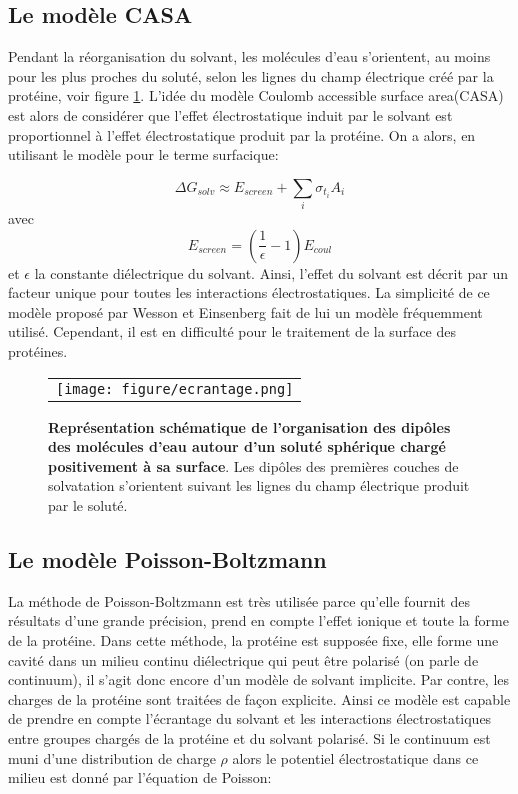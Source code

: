 \subsection{Le modèle CASA}
\label{sub:CASA}
Pendant la réorganisation du solvant, les molécules d'eau s'orientent, au moins pour les plus proches du soluté, selon les lignes du champ électrique créé par la protéine, voir figure \ref{graph:ecrantage}. L'idée du modèle \og Coulomb accessible surface area\fg (CASA) est alors de considérer que l'effet électrostatique induit par le solvant est proportionnel à l'effet électrostatique produit par la protéine. On a  alors, en utilisant le modèle  pour le terme surfacique:

\begin{equation}
\Delta G_{solv} \approx E_{screen} + \sum_i \sigma_{t_i} A_i
\end{equation}
avec 
\begin{equation}
E_{screen} =  (\frac{1}{\epsilon} -1 )E_{coul}
\end{equation}
et $ \epsilon $ la constante diélectrique du solvant. Ainsi, l'effet du solvant est décrit par un facteur unique pour toutes les interactions électrostatiques. La simplicité de ce modèle proposé par Wesson et Einsenberg \cite{Wesson92} fait de lui un modèle fréquemment utilisé. Cependant, il est en difficulté pour le traitement de la surface des protéines.


   \begin{figure}[!htbp]
     \centering
     \begin{tabular}{c}
       \texttt{[image: figure/ecrantage.png]} &
     \end{tabular}
     
     \caption{\textbf{Représentation schématique de l'organisation des dipôles des molécules d'eau autour d'un soluté sphérique chargé positivement à sa surface}. Les dipôles des premières couches de solvatation s'orientent suivant les lignes du champ électrique produit par le soluté.}
\label{graph:ecrantage}
   \end{figure}
   
\subsection{Le modèle Poisson-Boltzmann}
La méthode de Poisson-Boltzmann est très utilisée parce qu'elle fournit des résultats d'une grande précision, prend en compte l'effet ionique et toute la forme de la protéine. Dans cette méthode, la protéine est supposée fixe, elle forme une cavité dans un milieu continu diélectrique qui peut être polarisé (on parle de continuum), il s'agit donc encore d'un modèle de solvant implicite. Par contre, les charges de la protéine sont traitées de façon explicite. Ainsi ce modèle est capable de prendre en compte l'écrantage du solvant et les interactions électrostatiques entre groupes chargés de la protéine et du solvant polarisé. Si le continuum est muni d'une distribution de charge $\rho$ alors le potentiel électrostatique dans ce milieu est donné par l'équation de Poisson:

